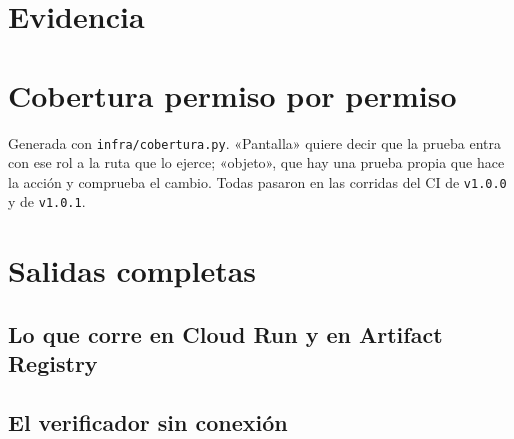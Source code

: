 \documentclass[11pt,letterpaper]{article}
\newcommand{\cod}[1]{\texttt{\small #1}}
\newcommand{\arch}[1]{\texttt{\small #1}}
\begin{document}
\section{Evidencia}\label{sec:evidencia}



\newpage
\appendix
\section{Cobertura permiso por permiso}

Generada con \arch{infra/cobertura.py}. «Pantalla» quiere decir que la prueba entra con ese rol a la
ruta que lo ejerce; «objeto», que hay una prueba propia que hace la acción y comprueba el cambio. Todas
pasaron en las corridas del CI de \cod{v1.0.0} y de \cod{v1.0.1}.



\section{Salidas completas}

\subsection*{Lo que corre en Cloud Run y en Artifact Registry}
\begin{salida}
\end{salida}

\subsection*{El verificador sin conexión}
\begin{salida}
\end{salida}
\end{document}
